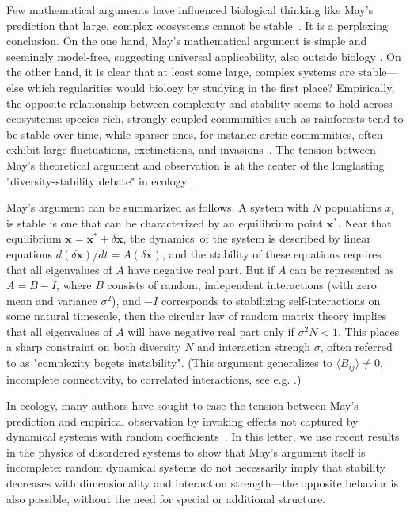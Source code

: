 
Few mathematical arguments have influenced biological thinking like May's prediction that large, complex ecosystems cannot be stable~\cite{May1972}.
It is a perplexing conclusion.
On the one hand, May's mathematical argument is simple and seemingly model-free, suggesting universal applicability, also outside biology \cite{Haldane2011, Moran2019}.
On the other hand, it is clear that at least some large, complex systems are stable---else which regularities would biology by studying in the first place? Empirically, the opposite relationship between complexity and stability seems to hold across ecosystems: species-rich, strongly-coupled communities such as rainforests tend to be stable over time, while sparser ones, for instance arctic communities, often exhibit large fluctuations, exctinctions, and invasions~\cite{Hutchinson1959,Odum1959,MacArthur1955}. 
The tension between May's theoretical argument and  observation is at the center of the longlasting "diversity-stability debate" in ecology \cite{McCann2000, Loreau2022}.

May's argument can be summarized as follows.
A system with $N$ populations $x_i$ is stable is one that can be characterized by an equilibrium point $\mathbf x^*$.
Near that equilibrium $\mathbf x = \mathbf x^* + \delta \mathbf x$, the dynamics of the system is described by linear equations $d(\delta \mathbf x)/dt = A (\delta \mathbf x)$, and the stability of these equations requires that all eigenvalues of $A$ have negative real part.
But if $A$ can be represented as $A = B - I$, where $B$ consists of random, independent interactions (with zero 
mean and variance $\sigma^2$), and $-I$ corresponds to stabilizing self-interactions on some natural timescale, 
then the circular law of random matrix theory implies that all eigenvalues of $A$ will have negative real part only if $\sigma^2 N < 1$.
This places a sharp constraint on both diversity $N$ and interaction strengh $\sigma$, often referred to as "complexity begets instability".
(This argument generalizes to $\langle B_{ij}\rangle \neq 0$, incomplete connectivity, to correlated interactions, see e.g. \cite{allesina2015stability}.)

In ecology, many authors have sought to ease the tension between May's 
prediction and empirical observation by invoking effects not captured by 
dynamical systems with random 
coefficients~\cite{McCann2000,Chesson2000,Mougi2012,Rohr2014,Barabas2017,Grilli2017}. In this letter, we use recent results in the physics of disordered systems \cite{Ahmadian2015, Roy2019} to show that May's argument itself is incomplete: 
random dynamical systems do not necessarily imply that 
stability decreases with dimensionality and interaction 
strength---the opposite behavior is also possible, 
without the need for special or additional structure.
